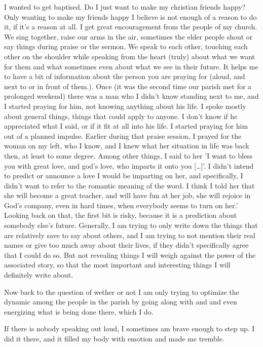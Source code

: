 \documentclass[11pt]{article}
\author{chris}
\date{\today}
\title{}
\begin{document}
\tableofcontents

I wanted to get baptised. Do I just want to make my christian friends happy?
Only wanting to make my friends happy I believe is not enough of a reason to do it, if it's a reason at all. 
I get great encouragement from the people of my church. We sing together, raise our arms in the air, sometimes the elder people shout or say things during praise or the sermon. We speak to each other, touching each other on the shoulder while speaking from the heart (truly) about what we want for them and what sometimes even about what we see in their future. It helps me to have a bit of information about the person you are praying for (aloud, and next to or in front of them.). Once (it was the second time our parish met for a prolonged weekend) there was a man who I didn't know standing next to me, and I started praying for him, not knowing anything about his life. I spoke mostly about general things, things that could apply to anyone. I don't know if he appreciated what I said, or if it fit at all into his life. I started praying for him out of a planned impulse. 
Earlier during that praise session, I prayed for the woman on my left, who I know, and I knew what her situation in life was back then, at least to some degree. Among other things, I said to her 'I want to bless you with great love, and god's love, who imparts it onto you [\ldots{}]'. I didn't intend to predict or announce a love I would be imparting on her, and specifically, I didn't want to refer to the romantic meaning of the word. I think I told her that she will become a great teacher, and will have fun at her job, she will rejoice in God's company, even in hard times, when everybody seems to turn on her.' Looking back on that, the first bit is risky, because it is a prediction about somebody else's future. Generally, I am trying to only write down the things that are relatively save to say about others, and I am trying to not mention their real names or give too much away about their lives, if they didn't specifically agree that I could do so. But not revealing things I will weigh against the power of the associated story, so that the most important and interesting things I will definitely write about. 

Now back to the question of wether or not I am only trying to optimize the dynamic among the people in the parish by going along with and and even energizing what is being done there, which I do.

If there is nobody speaking out loud, I sometimes am brave enough to step up. I did it there, and it filled my body with emotion and made me tremble.
\end{document}
